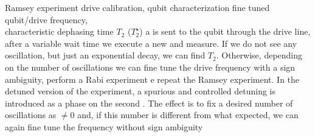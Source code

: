 \experimentrecap
{Ramsey experiment}
{drive calibration, qubit characterization}
{fine tuned qubit/drive frequency,\\characteristic dephasing time $T_2$ ($T_2^\star$)}
{a \pihpulse is sent to the qubit through the drive line, after a variable wait time we execute a new \pihpulse and measure.
If we do not see any oscillation, but just an exponential decay, we can find $T_2$. Otherwise, depending on the number of oscillations we can fine tune the drive frequency with a sign ambiguity, perform a Rabi experiment e repeat the Ramsey experiment. In the detuned version of the experiment, a spurious and controlled detuning is introduced as a phase on the second \pihpulse. The effect is to fix a desired number of oscillations as $\neq 0$ and, if this number is different from what expected, we can again fine tune the frequency without sign ambiguity}

